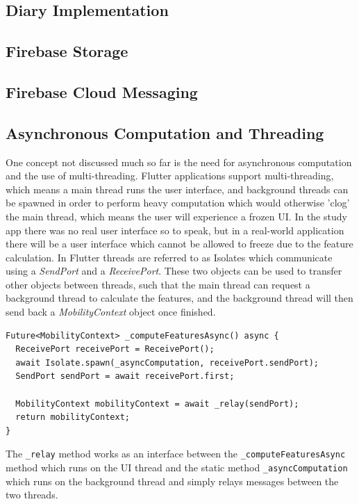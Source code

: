 \subsection{Diary Implementation}

\subsection{Firebase Storage}

\subsection{Firebase Cloud Messaging}


\subsection{Asynchronous Computation and Threading}
One concept not discussed much so far is the need for asynchronous computation and the use of multi-threading. Flutter applications support multi-threading, which means a main thread runs the user interface, and background threads can be spawned in order to perform heavy computation which would otherwise 'clog' the main thread, which means the user will experience a frozen UI. In the study app there was no real user interface so to speak, but in a real-world application there will be a user interface which cannot be allowed to freeze due to the feature calculation. In Flutter threads are referred to as Isolates which communicate using a \textit{SendPort} and a \textit{ReceivePort}. These two objects can be used to transfer other objects between threads, such that the main thread can request a background thread to calculate the features, and the background thread will then send back a \textit{MobilityContext} object once finished. 

\begin{verbatim}
Future<MobilityContext> _computeFeaturesAsync() async {
  ReceivePort receivePort = ReceivePort();
  await Isolate.spawn(_asyncComputation, receivePort.sendPort);
  SendPort sendPort = await receivePort.first;

  MobilityContext mobilityContext = await _relay(sendPort);
  return mobilityContext;
}
\end{verbatim}

The \verb|_relay| method works as an interface between the \verb|_computeFeaturesAsync| method which runs on the UI thread and the static method \verb|_asyncComputation| which runs on the background thread and simply relays messages between the two threads.

